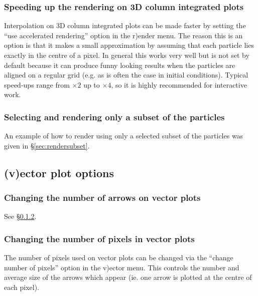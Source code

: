 \documentclass[a4paper,11pt]{article}
\begin{document}
\subsubsection{ Speeding up the rendering on 3D column integrated plots}
 Interpolation on 3D column integrated plots can be made faster by setting the ``use accelerated rendering'' option in the r)ender menu. The reason this is an option is that it makes a small approximation by assuming that each particle lies exactly in the centre of a pixel.  In general this works very well but is not set by default because it can produce funny looking results when the particles are aligned on a regular grid (e.g. as is often the case in initial conditions). Typical speed-ups range from $\times 2$ up to $\times 4$, so it is highly recommended for interactive work.

\subsubsection{ Selecting and rendering only a subset of the particles}
 An example of how to render using only a selected subset of the particles was given in \S\ref{sec:rendersubset}.

\subsection{(v)ector plot options}
\label{sec:vectorplots}

\subsubsection{ Changing the number of arrows on vector plots}
 See \S\ref{sec:vecpix}.

\subsubsection{ Changing the number of pixels in vector plots}
\label{sec:vecpix}
 The number of pixels used on vector plots can be changed via the ``change number of pixels'' option in the v)ector menu. This controls the number and average size of the arrows which appear (ie. one arrow is plotted at the centre of each pixel).
\end{document}
